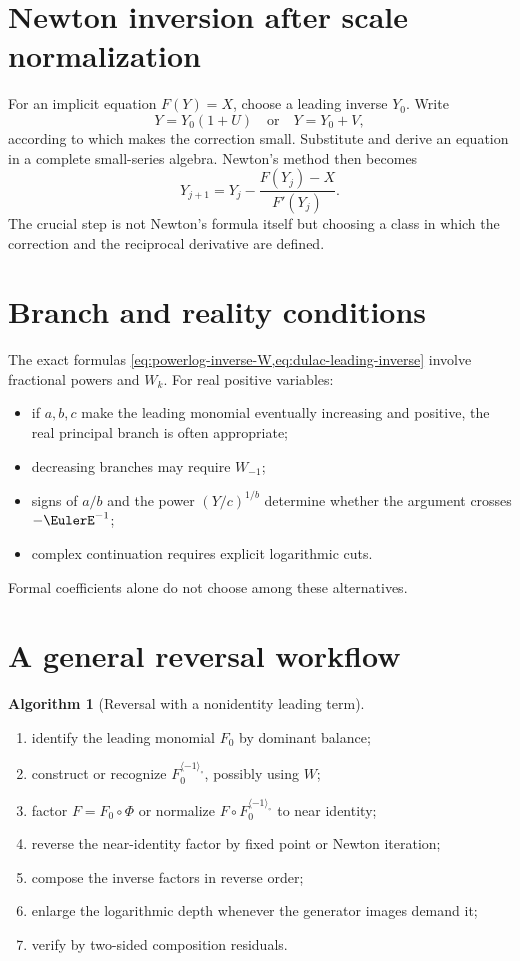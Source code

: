\documentclass[11pt,openany]{book}
\theoremstyle{definition}
\newtheorem{algorithm}{Algorithm}[chapter]
\theoremstyle{plain}
\theoremstyle{remark}
\newcommand{\invcomp}{^{\langle -1\rangle_{\circ}}}
\begin{document}
\section{Newton inversion after scale normalization}
For an implicit equation \(F(Y)=X\), choose a leading inverse \(Y_0\). Write
\[
 Y=Y_0(1+U)
 \quad\text{or}\quad
 Y=Y_0+V,
\]
according to which makes the correction small. Substitute and derive an equation in a complete small-series algebra. Newton's method then becomes
\begin{equation}\label{eq:newton-implicit}
 Y_{j+1}=Y_j-\frac{F(Y_j)-X}{F'(Y_j)}.
\end{equation}
The crucial step is not Newton's formula itself but choosing a class in which the correction and the reciprocal derivative are defined.

\section{Branch and reality conditions}
The exact formulas \cref{eq:powerlog-inverse-W,eq:dulac-leading-inverse} involve fractional powers and \(W_k\). For real positive variables:
\begin{itemize}
\item if \(a,b,c\) make the leading monomial eventually increasing and positive, the real principal branch is often appropriate;
\item decreasing branches may require \(W_{-1}\);
\item signs of \(a/b\) and the power \((Y/c)^{1/b}\) determine whether the argument crosses \(-\EulerE^{-1}\);
\item complex continuation requires explicit logarithmic cuts.
\end{itemize}
Formal coefficients alone do not choose among these alternatives.

\section{A general reversal workflow}
\begin{algorithm}[Reversal with a nonidentity leading term]\label{alg:general-reversal}
\begin{enumerate}
\item identify the leading monomial \(F_0\) by dominant balance;
\item construct or recognize \(F_0\invcomp\), possibly using \(W\);
\item factor \(F=F_0\circ\Phi\) or normalize \(F\circ F_0\invcomp\) to near identity;
\item reverse the near-identity factor by fixed point or Newton iteration;
\item compose the inverse factors in reverse order;
\item enlarge the logarithmic depth whenever the generator images demand it;
\item verify by two-sided composition residuals.
\end{enumerate}
\end{algorithm}
\end{document}
